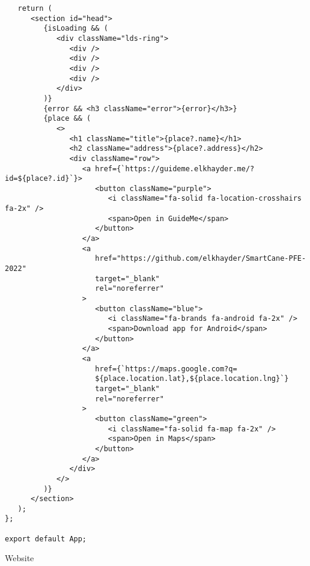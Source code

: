 \begin{code}
\begin{verbatim}
   return (
      <section id="head">
         {isLoading && (
            <div className="lds-ring">
               <div />
               <div />
               <div />
               <div />
            </div>
         )}
         {error && <h3 className="error">{error}</h3>}
         {place && (
            <>
               <h1 className="title">{place?.name}</h1>
               <h2 className="address">{place?.address}</h2>
               <div className="row">
                  <a href={`https://guideme.elkhayder.me/?id=${place?.id}`}>
                     <button className="purple">
                        <i className="fa-solid fa-location-crosshairs fa-2x" />
                        <span>Open in GuideMe</span>
                     </button>
                  </a>
                  <a
                     href="https://github.com/elkhayder/SmartCane-PFE-2022"
                     target="_blank"
                     rel="noreferrer"
                  >
                     <button className="blue">
                        <i className="fa-brands fa-android fa-2x" />
                        <span>Download app for Android</span>
                     </button>
                  </a>
                  <a
                     href={`https://maps.google.com?q=
                     ${place.location.lat},${place.location.lng}`}
                     target="_blank"
                     rel="noreferrer"
                  >
                     <button className="green">
                        <i className="fa-solid fa-map fa-2x" />
                        <span>Open in Maps</span>
                     </button>
                  </a>
               </div>
            </>
         )}
      </section>
   );
};

export default App;

\end{verbatim}
\caption{Website}
\end{code}
